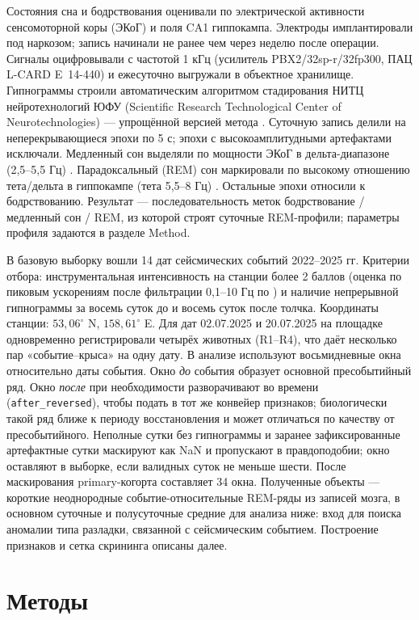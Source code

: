 Состояния сна и бодрствования оценивали по электрической активности сенсомоторной коры (ЭКоГ) и поля CA1 гиппокампа. Электроды имплантировали под наркозом; запись начинали не ранее чем через неделю после операции. Сигналы оцифровывали с частотой 1 кГц (усилитель PBX2/32sp-r/32fp300, ПАЦ L-CARD E~14-440) и ежесуточно выгружали в объектное хранилище. Гипнограммы строили автоматическим алгоритмом стадирования НИТЦ нейротехнологий ЮФУ (Scientific Research Technological Center of Neurotechnologies) — упрощённой версией метода \cite{Saevskiy2025}. Суточную запись делили на неперекрывающиеся эпохи по 5 с; эпохи с высокоамплитудными артефактами исключали. Медленный сон выделяли по мощности ЭКоГ в дельта-диапазоне (2,5–5,5 Гц) \cite{Fang2010}. Парадоксальный (REM) сон маркировали по высокому отношению тета/дельта в гиппокампе (тета 5,5–8 Гц) \cite{Fang2010,Saevskiy2025}. Остальные эпохи относили к бодрствованию. Результат — последовательность меток бодрствование / медленный сон / REM, из которой строят суточные REM-профили; параметры профиля задаются в разделе Method.

В базовую выборку вошли 14 дат сейсмических событий 2022–2025 гг. Критерии отбора: инструментальная интенсивность на станции более 2 баллов (оценка по пиковым ускорениям после фильтрации 0,1–10 Гц по \cite{GOST2017}) и наличие непрерывной гипнограммы за восемь суток до и восемь суток после толчка. Координаты станции: \(53{,}06^{\circ}\) N, \(158{,}61^{\circ}\) E. Для дат 02.07.2025 и 20.07.2025 на площадке одновременно регистрировали четырёх животных (R1–R4), что даёт несколько пар «событие–крыса» на одну дату. В анализе используют восьмидневные окна относительно даты события. Окно \emph{до} события образует основной пресобытийный ряд. Окно \emph{после} при необходимости разворачивают во времени (\texttt{after\_reversed}), чтобы подать в тот же конвейер признаков; биологически такой ряд ближе к периоду восстановления и может отличаться по качеству от пресобытийного. Неполные сутки без гипнограммы и заранее зафиксированные артефактные сутки маскируют как NaN и пропускают в правдоподобии; окно оставляют в выборке, если валидных суток не меньше шести. После маскирования primary-когорта составляет 34 окна. Полученные объекты — короткие неоднородные событие-относительные REM-ряды из записей мозга, в основном суточные и полусуточные средние для анализа ниже: вход для поиска аномалии типа разладки, связанной с сейсмическим событием. Построение признаков и сетка скрининга описаны далее.

\section{Методы}


